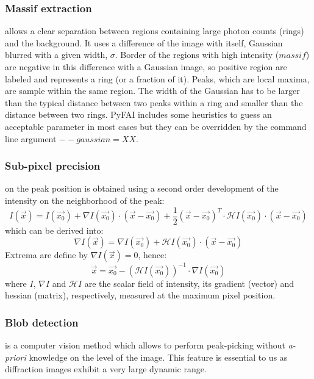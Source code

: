 \documentclass[preprint]{iucr}
\begin{document}
\subsubsection{Massif extraction}
\label{massif}
allows a clear separation between regions containing large
photon counts (rings) and the background.
It uses a difference of the image with itself, Gaussian blurred with a given
width, $\sigma$. 
Border of the regions with high intensity ($massif$) are negative in this
difference with a Gaussian image, so positive region are labeled and represents
a ring (or a fraction of it). Peaks, which are local maxima, are sample within
the same region.
The width of the Gaussian has to be larger than the typical distance
between two peaks within a ring and smaller than the distance between two
rings. 
PyFAI includes some heuristics to guess an acceptable parameter in most cases
but they can be overridden by the command line argument $--gaussian=XX$.

\subsubsection{Sub-pixel precision} 
\label{subpixel}
on the peak position is obtained using a second order development of the
intensity on the neighborhood of the peak:
$$ I(\overrightarrow{x}) = I(\overrightarrow{x_0}) + \nabla
I(\overrightarrow{x_0})\cdot (\overrightarrow{x}-\overrightarrow{x_0}) +
\frac{1}{2} (\overrightarrow{x}-\overrightarrow{x_0})^T\cdot\mathcal{H}
I(\overrightarrow{x_0})\cdot(\overrightarrow{x}-\overrightarrow{x_0})$$ which
can be derived into:
$$\nabla I(\overrightarrow{x}) =\nabla I(\overrightarrow{x_0}) +
\mathcal{H}I(\overrightarrow{x_0})\cdot(\overrightarrow{x}-\overrightarrow{x_0})$$
Extrema are define by $\nabla I(\overrightarrow{x})=0$, hence:
$$\overrightarrow{x} = \overrightarrow{x_0} - (\mathcal{H}
I(\overrightarrow{x_0}))^{-1}\cdot\nabla I(\overrightarrow{x_0})$$ where $I$,
$\nabla I$ and $\mathcal{H} I$ are the scalar field of intensity, its gradient
(vector) and hessian (matrix), respectively, measured at the maximum pixel position.

\subsubsection{Blob detection}
\label{blob}
is a computer vision method which allows to perform peak-picking without
\textit{a-priori} knowledge on the level of the image.
This feature is essential to us as diffraction images exhibit a very large
dynamic range.
\end{document}
